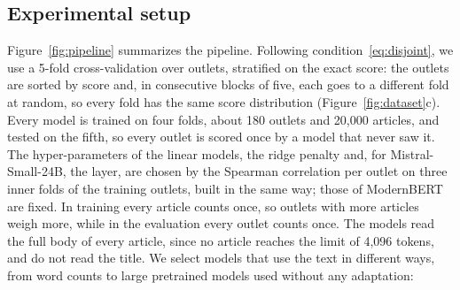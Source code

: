 \documentclass[11pt,a4paper]{article}
\begin{document}
\subsection{Experimental setup}\label{sec:setup}
Figure~\ref{fig:pipeline} summarizes the pipeline. Following condition~\eqref{eq:disjoint}, we use a 5-fold
cross-validation over outlets, stratified on the exact score: the outlets are sorted by score and, in consecutive blocks
of five, each goes to a different fold at random, so every fold has the same score distribution
(Figure~\ref{fig:dataset}c). Every model is trained on four folds, about 180 outlets and 20,000 articles, and tested on
the fifth, so every outlet is scored once by a model that never saw it. The hyper-parameters of the linear models, the
ridge penalty and, for Mistral-Small-24B, the layer, are chosen by the Spearman correlation per outlet on three inner
folds of the training outlets, built in the same way; those of ModernBERT are fixed. In training every article counts
once, so outlets with more articles weigh more, while in the evaluation every outlet counts once. The models read the
full body of every article, since no article reaches the limit of 4,096 tokens, and do not read the title. We select
models that use the text in different ways, from word counts to large pretrained models used without any adaptation:
\end{document}
